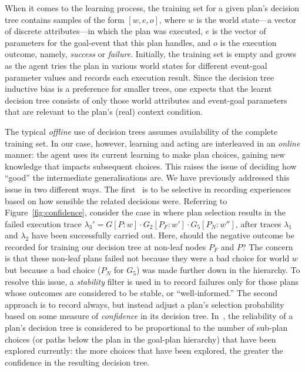 When it comes to the learning process, the training set for a given plan's decision tree contains samples of the form $[w, e, o]$, where $w$ is the world state---a vector of discrete attributes---in which the plan was executed, $e$ is the vector of parameters for the goal-event that this plan handles, and $o$ is the execution outcome, namely, \emph{success} or \emph{failure}. Initially, the training set is empty and grows as the agent tries the plan in various world states for different event-goal parameter values and records each execution result. 
Since the decision tree inductive bias is a preference for smaller trees, one expects that the learnt decision tree consists of only those world attributes and event-goal parameters that are relevant to the plan's (real) context condition.

The typical {\em offline} use of decision trees assumes availability of the complete training set. In our case, however, learning and acting are interleaved in an {\em online} manner: the agent uses its current learning to make plan choices, gaining new knowledge that impacts subsequent choices. This raises the issue of deciding how ``good'' the intermediate generalisations are. We have previously addressed this issue in two different ways. The first~\cite{airiau09:enhancing} is to be selective in recording experiences based on how sensible the related decisions were. 
Referring to Figure~\ref{fig:confidence}, consider the case in  where plan selection results in the failed execution trace $\lambda_3' = G[P:w] \cdot G_2[P_F:w'] \cdot G_5[P_N:w'']$, after traces $\lambda_1$ and $\lambda_2$ have been successfully carried out. 
Here, should the negative outcome be recorded for training our decision tree at non-leaf nodes $P_F$ and $P$? The concern is that these non-leaf plans failed not because they were a bad choice for world $w$ but because a bad choice ($P_N$ for $G_5$) was made further down in the hierarchy. To resolve this issue, a {\em stability} filter is used in \cite{airiau09:enhancing} to record failures only for those plans whose outcomes are considered to be stable, or ``well-informed.'' 
The second approach is to record always, but instead adjust a plan's selection probability based on some measure of {\em confidence} in its decision tree. In~\cite{singh10:extending,singh10:learning}, the reliability of a plan's decision tree is considered to be proportional to the number of sub-plan choices (or paths below the plan in the goal-plan hierarchy) that have been explored currently: the more choices that have been explored, the greater the confidence in the resulting decision tree. 

